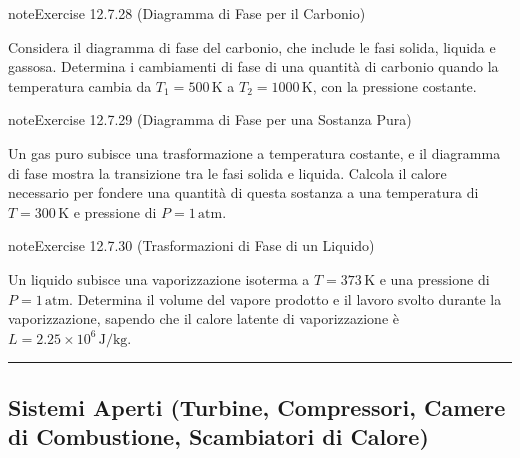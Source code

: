 \documentclass[letterpaper,10pt,italian]{jupyterBook}
\begin{document}
\begin{sphinxadmonition}{note}{Exercise 12.7.28 (Diagramma di Fase per il Carbonio)}



\sphinxAtStartPar
Considera il diagramma di fase del carbonio, che include le fasi solida, liquida e gassosa. Determina i cambiamenti di fase di una quantità di carbonio quando la temperatura cambia da \(T_1 = 500 \, \text{K}\) a \(T_2 = 1000 \, \text{K}\), con la pressione costante.
\end{sphinxadmonition}
 \label{exercise:ch/thermodynamics/principles-problems-exercise-28}

\begin{sphinxadmonition}{note}{Exercise 12.7.29 (Diagramma di Fase per una Sostanza Pura)}



\sphinxAtStartPar
Un gas puro subisce una trasformazione a temperatura costante, e il diagramma di fase mostra la transizione tra le fasi solida e liquida. Calcola il calore necessario per fondere una quantità di questa sostanza a una temperatura di \(T = 300 \, \text{K}\) e pressione di \(P = 1 \, \text{atm}\).
\end{sphinxadmonition}
 \label{exercise:ch/thermodynamics/principles-problems-exercise-29}

\begin{sphinxadmonition}{note}{Exercise 12.7.30 (Trasformazioni di Fase di un Liquido)}



\sphinxAtStartPar
Un liquido subisce una vaporizzazione isoterma a \(T = 373 \, \text{K}\) e una pressione di \(P = 1 \, \text{atm}\). Determina il volume del vapore prodotto e il lavoro svolto durante la vaporizzazione, sapendo che il calore latente di vaporizzazione è \(L = 2.25 \times 10^6 \, \text{J/kg}\).
\end{sphinxadmonition}


\bigskip\hrule\bigskip



\subsection{Sistemi Aperti (Turbine, Compressori, Camere di Combustione, Scambiatori di Calore)}
\label{\detokenize{ch/thermodynamics/principles-problems:sistemi-aperti-turbine-compressori-camere-di-combustione-scambiatori-di-calore}} \label{exercise:ch/thermodynamics/principles-problems-exercise-30}
\end{document}
